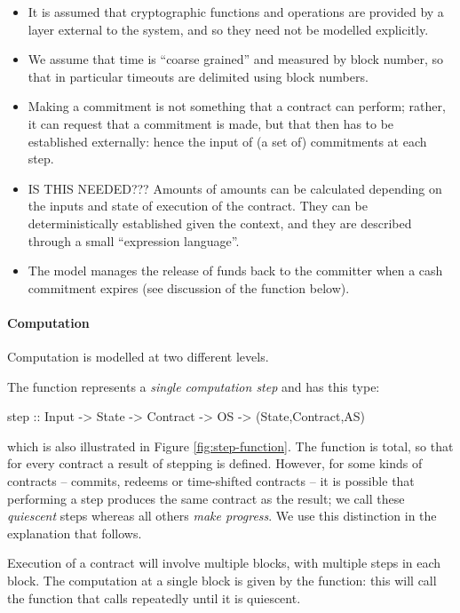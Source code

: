 \documentclass[runningheads]{llncs}
\begin{document}
\begin{itemize}
\item It is assumed that cryptographic functions and operations are provided by a layer external to the system, and so 
they need not be modelled explicitly.
\item We assume that time is ``coarse grained'' and measured by block number, so that in particular timeouts are 
delimited using block numbers. 
\item 
Making a commitment is not something that a contract can perform; rather, it 
can request that a commitment is made, but that then has to be established externally: hence the input of (a set of) 
commitments at each step.
\item
IS THIS NEEDED???
Amounts of  amounts can be calculated depending on the inputs and state of execution of the 
contract. They can be deterministically established given the context, and they are described through a small 
``expression language''.
\item The model manages the release of funds back to the committer when a cash commitment expires (see discussion of 
the  function below).
\end{itemize}

\paragraph{Computation}

Computation is modelled at two different levels. 

The  function represents a \emph{single computation step} and has this type:
\begin{haskellcode}
step :: Input -> State -> Contract -> OS -> (State,Contract,AS)
\end{haskellcode}
which is also illustrated in Figure \ref{fig:step-function}. 
The  function is total, so that for every contract a result of stepping is defined. However, for 
some kinds of contracts -- commits, redeems or time-shifted contracts -- it is possible that performing  a step produces the same contract as the result; we call these \emph{quiescent} steps whereas all others \emph{make 
progress}. We use this distinction in the explanation that follows.

Execution of a contract will involve multiple blocks, with multiple steps in each block. The computation at a single block is given by the  function: this will call the  function that calls  repeatedly
until it is quiescent. 
\end{document}
